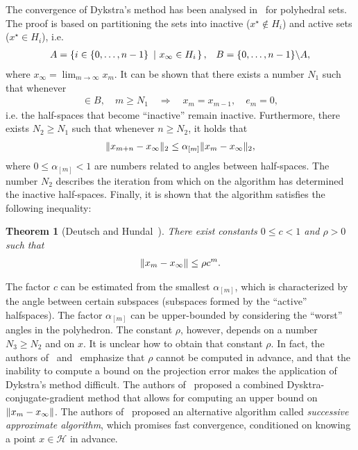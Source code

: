 \documentclass[hidelinks]{article}
\newtheorem{theorem}{Theorem}
\begin{document}
The convergence of Dykstra's method has been analysed in~\cite{DYKSTRAPOLY2,DYKSTRAPOLY,DYKSTRAPERKINS} for polyhedral sets. The proof is based on partitioning the sets into inactive ($x^\star\not\in H_i$) and active sets ($x^\star\in H_i$), i.e.\
\begin{align}
&A=\left\{ i\in\lbrace 0,\dots,n-1\rbrace\ \left| \ x_\infty\in H_i \right. \right\},
&B=\lbrace 0,\dots,n-1\rbrace\backslash A,
\end{align}
where $x_\infty=\lim_{m\rightarrow\infty}x_m$. It can be shown that there exists a number $N_1$ such that whenever
\begin{align}
[m]\in B,\quad m\geq N_1\quad\Rightarrow\quad x_m=x_{m-1},\quad e_m=0,
\end{align}
i.e. the half-spaces that become ``inactive'' remain inactive. Furthermore, there exists $N_2\geq N_1$ such that whenever $n\geq N_2$, it holds that
\begin{align}\label{eq:dykstra:error:poly}
\Vert x_{m+n}-x_\infty \Vert_2\leq\alpha_{[m]}\Vert x_m-x_\infty \Vert_2,
\end{align}
where $0\leq\alpha_{[m]}<1$ are numbers related to angles between half-spaces. The number $N_2$ describes the iteration from which on the algorithm has determined the inactive half-spaces. Finally, it is shown that the algorithm satisfies the following inequality:
\begin{theorem}[Deutsch and Hundal~\cite{DYKSTRAPOLY}]
There exist constants $0\leq c < 1$ and $\rho > 0$ such that
\begin{align*}
\Vert x_m -x_\infty \Vert \leq \rho c^m.
\end{align*}
\end{theorem}
The factor $c$ can be estimated from the smallest $\alpha_{[m]}$, which is characterized by the angle between certain subspaces (subspaces formed by the ``active'' halfspaces). The factor $\alpha_{[m]}$ can be upper-bounded by considering the ``worst'' angles in the polyhedron. The constant $\rho$, however, depends on a number $N_3\geq N_2$ and on $x$. It is unclear how to obtain that constant $\rho$. In fact, the authors of~\cite{DYKSTRAPERKINS} and~\cite{XUPOLY} emphasize that $\rho$ cannot be computed in advance, and that the inability to compute a bound on the projection error makes the application of Dykstra's method difficult. The authors of~\cite{DYKSTRAPERKINS} proposed a combined Dysktra-conjugate-gradient method that allows for computing an upper bound on $\Vert x_m -x_\infty \Vert$. The authors of~\cite{XUPOLY} proposed an alternative algorithm called \emph{successive approximate algorithm}, which promises fast convergence, conditioned on knowing a point $x\in\mathcal{H}$ in advance.
\end{document}
